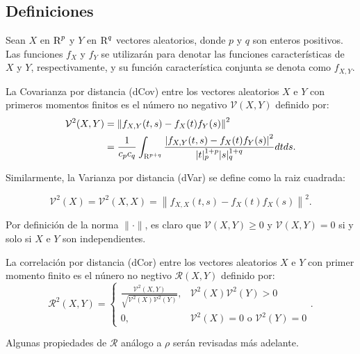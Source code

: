 \subsection{Definiciones}

Sean $X$ en $\textsc{R}^p$ y $Y$ en $\textsc{R}^q$ vectores aleatorios, donde $p$ y $q$ son enteros positivos. Las funciones $f_X$ y $f_Y$ se utilizarán para denotar las funciones caracter\'isticas de $X$ y $Y$, respectivamente, y su funci\'on caracter\'istica conjunta se denota como $f_{X, Y}$. 

\begin{defn}
	La Covarianza por distancia (dCov) entre los vectores aleatorios $X$ e $Y$ con primeros momentos finitos es el n\'umero no negativo $\mathcal{V}(X, Y)$ definido por:
	\begin{equation}
		\begin{aligned}\label{dcov_formula}
			\mathcal{V}^2(X, Y) & =\left\|f_{X, Y}(t, s)-f_X(t) f_Y(s)\right\|^2 \\
			& =\frac{1}{c_p c_q} \int_{\textsc{R}^{p+q}} \frac{\left|f_{X, Y}(t, s)-f_X(t) f_Y(s)\right|^2}{|t|_p^{1+p}|s|_q^{1+q}} d t d s .
			\end{aligned}
	\end{equation}

	\end{defn}

	Similarmente, la Varianza por distancia (dVar) se define como la raiz cuadrada:

	$$
	\mathcal{V}^2(X)=\mathcal{V}^2(X, X)=\left\|f_{X, X}(t, s)-f_X(t) f_X(s)\right\|^2 .
	$$

	Por definici\'on de la norma $\|\cdot\|$, es claro que  $\mathcal{V}(X, Y) \geq 0$ y $\mathcal{V}(X, Y)=0$ si y solo si $X$ e $Y$ son independientes.

	\begin{defn} 
		La correlaci\'on por distancia (dCor) entre los vectores aleatorios $X$ e $Y$ con primer momento finito es el n\'unero no negtivo $\mathcal{R}(X, Y)$ definido por:
		$$
		\mathcal{R}^2(X, Y)= \begin{cases}\frac{\mathcal{V}^2(X, Y)}{\sqrt{\mathcal{V}^2(X) \mathcal{V}^2(Y)}}, & \mathcal{V}^2(X) \mathcal{V}^2(Y)>0 \\ 0, & \mathcal{V}^2(X)=0 \text{ o } \mathcal{V}^2(Y)=0\end{cases}.
		$$

	Algunas propiedades de $\mathcal{R}$ an\'alogo a $\rho$ ser\'an revisadas m\'as adelante. 
	\end{defn}

